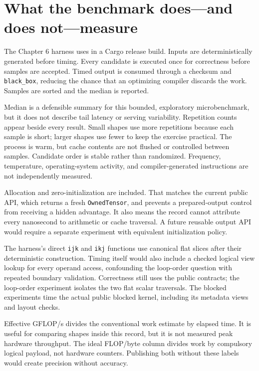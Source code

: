 \section{What the benchmark does---and does
not---measure}\label{what-the-benchmark-doesand-does-notmeasure}

The Chapter 6 harness uses \texttt{} in a
Cargo release build. Inputs are deterministically generated before
timing. Every candidate is executed once for correctness before samples
are accepted. Timed output is consumed through a checksum and
\texttt{black\_box}, reducing the chance that an optimizing compiler
discards the work. Samples are sorted and the median is reported.

Median is a defensible summary for this bounded, exploratory
microbenchmark, but it does not describe tail latency or serving
variability. Repetition counts appear beside every result. Small shapes
use more repetitions because each sample is short; larger shapes use
fewer to keep the exercise practical. The process is warm, but cache
contents are not flushed or controlled between samples. Candidate order
is stable rather than randomized. Frequency, temperature,
operating-system activity, and compiler-generated instructions are not
independently measured.

Allocation and zero-initialization are included. That matches the
current public API, which returns a fresh \texttt{OwnedTensor}, and
prevents a prepared-output control from receiving a hidden advantage. It
also means the record cannot attribute every nanosecond to arithmetic or
cache traversal. A future reusable output API would require a separate
experiment with equivalent initialization policy.

The harness's direct \texttt{ijk} and \texttt{ikj} functions use
canonical flat slices after their deterministic construction. Timing
\texttt{} itself would also include a
checked logical view lookup for every operand access, confounding the
loop-order question with repeated boundary validation. Correctness still
uses the public contracts; the loop-order experiment isolates the two
flat scalar traversals. The blocked experiments time the actual public
blocked kernel, including its metadata views and layout checks.

Effective GFLOP/s divides the conventional work estimate by elapsed
time. It is useful for comparing shapes inside this record, but it is
not measured peak hardware throughput. The ideal FLOP/byte column
divides work by compulsory logical payload, not hardware counters.
Publishing both without these labels would create precision without
accuracy.

